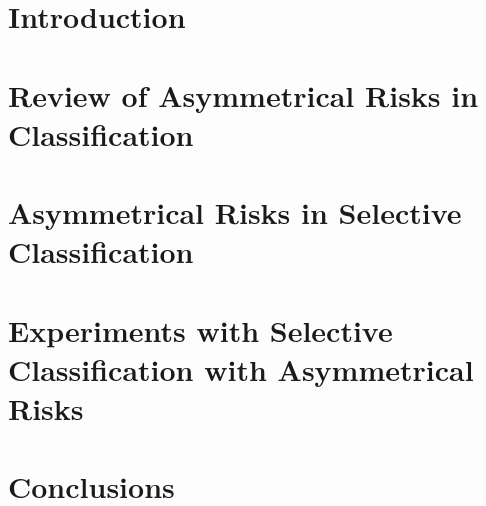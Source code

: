 \section{Introduction}


\section{Review of Asymmetrical Risks in Classification}



\section{Asymmetrical Risks in Selective Classification}



\section{Experiments with Selective Classification with Asymmetrical Risks}



\section{Conclusions}